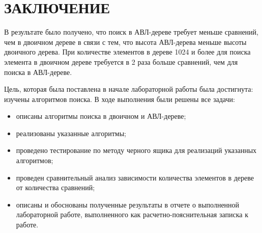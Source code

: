 \chapter*{ЗАКЛЮЧЕНИЕ}

В результате было получено, что поиск в АВЛ-дереве требует меньше сравнений, чем в двоичном дереве в связи с тем, что высота АВЛ-дерева меньше высоты двоичного дерева. При количестве элементов в дереве 1024 и более для поиска элемента в двоичном дереве требуется в 2 раза больше сравнений, чем для поиска в АВЛ-дереве.

Цель, которая была поставлена в начале лабораторной работы была достигнута: изучены алгоритмов поиска. В ходе выполнения были решены все задачи:

\begin{itemize}[label=---]
	\item описаны алгоритмы поиска в двоичном и АВЛ-дереве;
	\item реализованы указанные алгоритмы;
	
	\item проведено тестирование по методу черного ящика для реализаций указанных алгоритмов;
	
	\item проведен сравнительный анализ зависимости количества элементов в дереве от количества сравнений;
	
	\item описаны и обоснованы полученные результаты в отчете о выполненной лабораторной работе, выполненного как расчетно-пояснительная записка к работе.
\end{itemize}